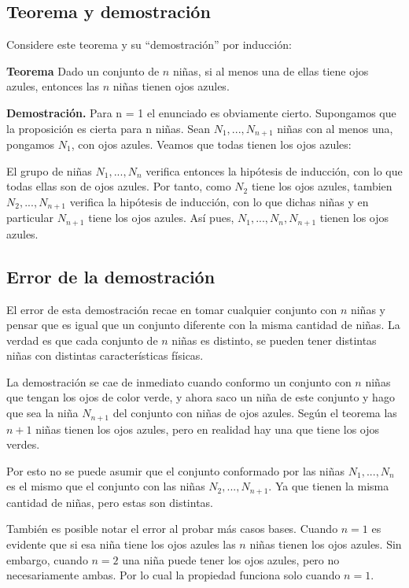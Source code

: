 \documentclass[../doc.tex]{subfiles}
\begin{document}
\subsection{Teorema y demostración}
Considere este teorema y su “demostración” por inducción:

\noindent \textbf{Teorema} Dado un conjunto de \(n\) niñas, si al menos una de ellas tiene
ojos azules, entonces las \(n\) niñas tienen ojos azules.

\noindent \textbf{Demostración.} Para n = 1 el enunciado es obviamente cierto. Supongamos
que la proposición es cierta para n niñas.
Sean \(N_1, ... , N_{n+1}\) niñas con al menos una, pongamos \(N_1\), con ojos azules.
Veamos que todas tienen los ojos azules:

\noindent El grupo de niñas \(N_1, ... , N_n\) verifica entonces la hipótesis de inducción,
con lo que todas ellas son de ojos azules. Por tanto, como \(N_2\) tiene los ojos azules,
tambien \(N_2, ... , N_{n+1}\) verifica la hipótesis de inducción, con lo que dichas niñas
y en particular \(N_{n+1}\) tiene los ojos azules. Así pues, \(N_1, ... , N_n, N_{n+1}\)
tienen los ojos azules.

\subsection{Error de la demostración}
El error de esta demostración recae en tomar cualquier conjunto con \(n\) niñas y pensar
que es igual que un conjunto diferente con la misma cantidad de niñas. La verdad es que
cada conjunto de \(n\) niñas es distinto, se pueden tener distintas niñas con
distintas características físicas.

\noindent La demostración se cae de inmediato cuando conformo un conjunto con \(n\) niñas
que tengan los ojos de color verde, y ahora saco un niña de este conjunto y hago que sea
la niña \(N_{n+1}\) del conjunto con niñas de ojos azules. Según el teorema las \(n + 1\)
niñas tienen los ojos azules, pero en realidad hay una que tiene los ojos verdes.

\noindent Por esto no se puede asumir que el conjunto conformado por las niñas \(N_1, ... ,
N_n\) es el mismo que el conjunto con las niñas \(N_2, ... , N_{n+1}\). Ya que tienen la
misma cantidad de niñas, pero estas son distintas.

\noindent También es posible notar el error al probar más casos bases. Cuando \(n = 1\)
es evidente que si esa niña tiene los ojos azules las \(n\) niñas tienen los ojos azules.
Sin embargo, cuando \(n = 2\) una niña puede tener los ojos azules, pero no necesariamente
ambas. Por lo cual la propiedad funciona solo cuando \(n = 1\).
\end{document}

